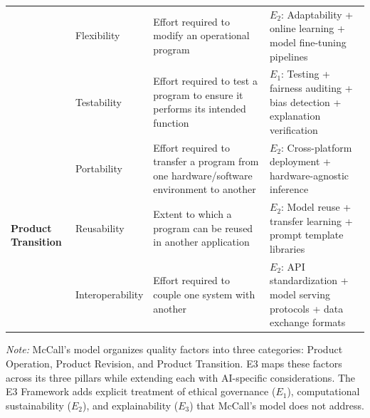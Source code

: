 \begin{table}[t]
\begin{tabularx}{\textwidth}{@{}l l X X@{}}
\addlinespace

& Flexibility & 
Effort required to modify an operational program &
\textbf{$E_2$}: Adaptability + online learning + model fine-tuning pipelines \\

\addlinespace

& Testability & 
Effort required to test a program to ensure it performs its intended function &
\textbf{$E_1$}: Testing + fairness auditing + bias detection + explanation verification \\

\midrule

\multirow{3}{*}{\textbf{Product Transition}} & 
Portability & 
Effort required to transfer a program from one hardware/software environment to another &
\textbf{$E_2$}: Cross-platform deployment + hardware-agnostic inference \\

\addlinespace

& Reusability & 
Extent to which a program can be reused in another application &
\textbf{$E_2$}: Model reuse + transfer learning + prompt template libraries \\

\addlinespace

& Interoperability & 
Effort required to couple one system with another &
\textbf{$E_2$}: API standardization + model serving protocols + data exchange formats \\

\bottomrule
\end{tabularx}

\vspace{0.5em}
\noindent\textit{Note:} McCall's model organizes quality factors into three categories: Product Operation, Product Revision, and Product Transition. E3 maps these factors across its three pillars while extending each with AI-specific considerations. The E3 Framework adds explicit treatment of ethical governance ($E_1$), computational sustainability ($E_2$), and explainability ($E_3$) that McCall's model does not address.

\end{table}